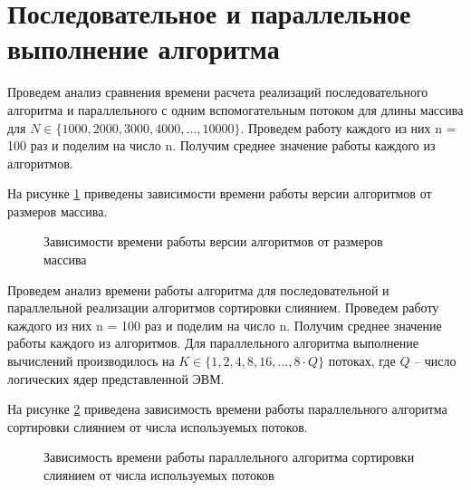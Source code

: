 \section{Последовательное и параллельное выполнение алгоритма}
Проведем анализ сравнения времени расчета реализаций последовательного алгоритма и параллельного с одним вспомогательным потоком для длины массива для $N \in \{1000, 2000, 3000, 4000, ..., 10000\}$. Проведем работу каждого из них n = 100 раз и поделим на число n. Получим среднее значение работы каждого из алгоритмов.

На рисунке \ref{fg:6_2} приведены зависимости времени работы версии алгоритмов от размеров массива.
\begin{figure}[H]
	\centering
	\caption{Зависимости времени работы версии алгоритмов от размеров массива} 
	\label{fg:6_2}
\end{figure}

\newpage
Проведем анализ времени работы алгоритма для последовательной и параллельной реализации алгоритмов сортировки слиянием. Проведем работу каждого из них n = 100 раз и поделим на число n. Получим среднее значение работы каждого из алгоритмов. Для параллельного алгоритма выполнение вычислений производилось на $K \in \{1, 2, 4, 8, 16, ... ,8 \cdot Q\}$ потоках, где $Q$ -- число
логических ядер представленной ЭВМ.

На рисунке \ref{fg:6_3} приведена зависимость времени работы параллельного алгоритма сортировки слиянием от числа используемых потоков.
\begin{figure}[H]
	\centering
	\caption{Зависимость времени работы параллельного алгоритма сортировки слиянием от числа используемых потоков} 
	\label{fg:6_3}
\end{figure}

